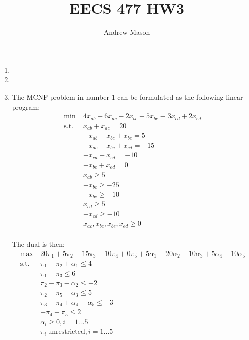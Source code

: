 \documentclass[12pt]{article}
\title{EECS 477 HW3}
\author{Andrew Mason}
\begin{document}
\maketitle

\begin{enumerate}
  \item
  \item
  \item
  The MCNF problem in number 1 can be formulated as the following linear program:\\
  \begin{equation}
    \begin{split}
      \text{min}\ &4x_{ab}+6x_{ac}-2x_{bc}+5x_{be}-3x_{cd}+2x_{ed}\\
      \text{s.t.}\ &x_{ab}+x_{ac}=20\\
      &-x_{ab}+x_{bc}+x_{be}=5\\
      &-x_{ac}-x_{bc}+x_{cd}=-15\\
      &-x_{cd}-x_{ed}=-10\\
      &-x_{be}+x_{ed}=0\\
      &x_{ab}\geq5\\
      &-x_{bc}\geq-25\\
      &-x_{be}\geq-10\\
      &x_{cd}\geq5\\
      &-x_{cd}\geq-10\\
      &x_{ac},x_{bc},x_{be},x_{ed}\geq0\\
    \end{split}
  \end{equation}

  The dual is then:\\
  \begin{equation}
    \begin{split}
      \text{max}\ &20\pi_1+5\pi_2-15\pi_3-10\pi_4+0\pi_5+5\alpha_1-20\alpha_2-10\alpha_3+5\alpha_4-10\alpha_5\\
      \text{s.t.}\ &\pi_1-\pi_2+\alpha_1\leq4\\
      &\pi_1-\pi_3\leq6\\
      &\pi_2-\pi_3-\alpha_2\leq-2\\
      &\pi_2-\pi_5-\alpha_3\leq5\\
      &\pi_3-\pi_4+\alpha_4-\alpha_5\leq-3\\
      &-\pi_4+\pi_5\leq2\\
      &\alpha_i\geq0,i=1\ldots5\\
      &\pi_i\ \text{unrestricted},i=1\ldots5\\
    \end{split}
  \end{equation}


\end{enumerate}
\end{document}
